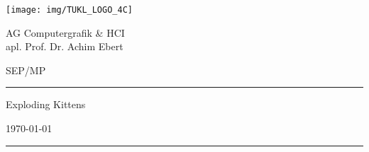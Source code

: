\thispagestyle{empty}
	\newcommand{\Rule}{\rule{\textwidth}{0.5mm}}
	\begin{center}
	{\Large \texttt{[image: img/TUKL\_LOGO\_4C]} \par}

	\vspace{0.5em}

	{\Large AG Computergrafik \& HCI \\ apl. Prof. Dr. Achim Ebert \par}

	\vspace{0.5em}

	{\Large SEP/MP \the\year \par}


	\vspace{5cm}

	\Rule

	\vspace{1cm}

	{\Huge Exploding Kittens \par}

	\vspace{0.5em}

	{\Large \mysubject \par}

	\vspace{0.5em}

	{\small \today \par}

	\vspace{0.7cm}

	\Rule


	\vfill %


	\emph{\textbf{\mygroup}} \\[1em]
	\myauthor

	\end{center}
